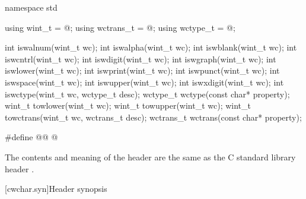 %
%
%
%
%
%
%
%
%
%
%
%
%
%
%
%
%
%
%
%
%
\begin{codeblock}
namespace std {
  using wint_t = @\seebelow@;
  using wctrans_t = @\seebelow@;
  using wctype_t = @\seebelow@;

  int iswalnum(wint_t wc);
  int iswalpha(wint_t wc);
  int iswblank(wint_t wc);
  int iswcntrl(wint_t wc);
  int iswdigit(wint_t wc);
  int iswgraph(wint_t wc);
  int iswlower(wint_t wc);
  int iswprint(wint_t wc);
  int iswpunct(wint_t wc);
  int iswspace(wint_t wc);
  int iswupper(wint_t wc);
  int iswxdigit(wint_t wc);
  int iswctype(wint_t wc, wctype_t desc);
  wctype_t wctype(const char* property);
  wint_t towlower(wint_t wc);
  wint_t towupper(wint_t wc);
  wint_t towctrans(wint_t wc, wctrans_t desc);
  wctrans_t wctrans(const char* property);
}

#define @@ @\seebelow@
\end{codeblock}

\pnum
The contents and meaning of the header 
are the same as the C standard library header .


[cwchar.syn]{Header  synopsis}

